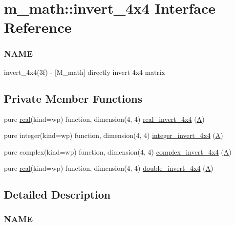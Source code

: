 \hypertarget{interfacem__math_1_1invert__4x4}{}\section{m\+\_\+math\+:\+:invert\+\_\+4x4 Interface Reference}
\label{interfacem__math_1_1invert__4x4}


\subsubsection*{N\+A\+ME}

invert\+\_\+4x4(3f) -\/ \mbox{[}M\+\_\+math\mbox{]} directly invert 4x4 matrix  


\subsection*{Private Member Functions}
\begin{DoxyCompactItemize}
\item 
pure \hyperlink{read__watch_83_8txt_abdb62bde002f38ef75f810d3a905a823}{real}(kind=wp) function, dimension(4, 4) \hyperlink{interfacem__math_1_1invert__4x4_ad4c399ec80f6bff8fd965e92b20579f6}{real\+\_\+invert\+\_\+4x4} (\hyperlink{ufpp__overview_81_8txt_a8341271e5f4e3003f6eb1c9547fc9d1a}{A})
\item 
pure integer(kind=wp) function, dimension(4, 4) \hyperlink{interfacem__math_1_1invert__4x4_acbe6e7d60661817554dfc2c98004835a}{integer\+\_\+invert\+\_\+4x4} (\hyperlink{ufpp__overview_81_8txt_a8341271e5f4e3003f6eb1c9547fc9d1a}{A})
\item 
pure complex(kind=wp) function, dimension(4, 4) \hyperlink{interfacem__math_1_1invert__4x4_a0fc7c320ee6876fab3394ec22528fa35}{complex\+\_\+invert\+\_\+4x4} (\hyperlink{ufpp__overview_81_8txt_a8341271e5f4e3003f6eb1c9547fc9d1a}{A})
\item 
pure \hyperlink{read__watch_83_8txt_abdb62bde002f38ef75f810d3a905a823}{real}(kind=wp) function, dimension(4, 4) \hyperlink{interfacem__math_1_1invert__4x4_a16ea03b6a71d45120118aa10c58397c3}{double\+\_\+invert\+\_\+4x4} (\hyperlink{ufpp__overview_81_8txt_a8341271e5f4e3003f6eb1c9547fc9d1a}{A})
\end{DoxyCompactItemize}


\subsection{Detailed Description}
\subsubsection*{N\+A\+ME}

